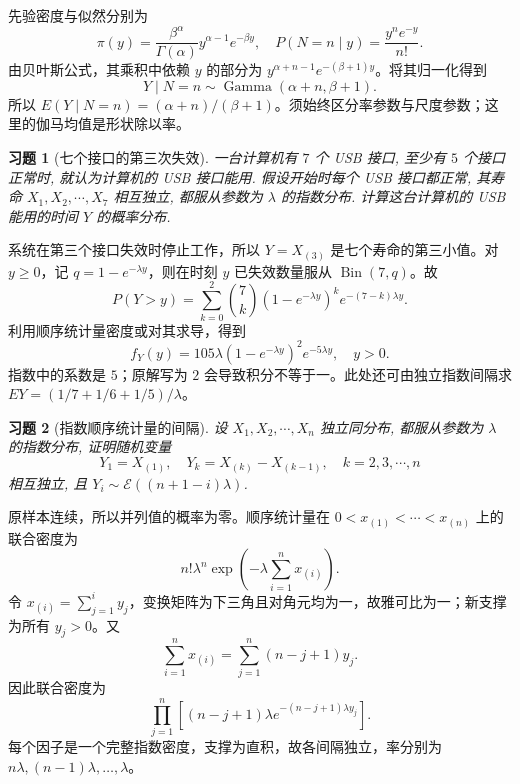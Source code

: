 \documentclass[UTF8,12pt,a4paper,fontset=fandol]{ctexart}
\newtheorem{exercise}{习题}[section]
\begin{document}
\begin{solve}\label{a:A6.15}先验密度与似然分别为\[\pi(y)=\frac{\beta^\alpha}{\Gamma(\alpha)}y^{\alpha-1}e^{-\beta y},\quad P(N=n\mid y)=\frac{y^ne^{-y}}{n!}.\]由贝叶斯公式，其乘积中依赖 $y$ 的部分为 $y^{\alpha+n-1}e^{-(\beta+1)y}$。将其归一化得到\[Y\mid N=n\sim\operatorname{Gamma}(\alpha+n,\beta+1).\]所以 $E(Y\mid N=n)=(\alpha+n)/(\beta+1)$。须始终区分率参数与尺度参数；这里的伽马均值是形状除以率。\end{solve}

\begin{exercise}[七个接口的第三次失效]\label{q:A6.17}
一台计算机有 $7$ 个 USB 接口, 至少有 $5$ 个接口正常时, 就认为计算机的 USB 接口能用. 假设开始时每个 USB 接口都正常, 其寿命 $X_1,X_2,\cdots,X_7$ 相互独立, 都服从参数为 $\lambda$ 的指数分布. 计算这台计算机的 USB 能用的时间 $Y$ 的概率分布.\par{}
\end{exercise}

\begin{solve}\label{a:A6.17}系统在第三个接口失效时停止工作，所以 $Y=X_{(3)}$ 是七个寿命的第三小值。对 $y\ge0$，记 $q=1-e^{-\lambda y}$，则在时刻 $y$ 已失效数量服从 $\operatorname{Bin}(7,q)$。故\[P(Y>y)=\sum_{k=0}^{2}\binom7k(1-e^{-\lambda y})^k e^{-(7-k)\lambda y}.\]利用顺序统计量密度或对其求导，得到\[f_Y(y)=105\lambda(1-e^{-\lambda y})^2e^{-5\lambda y},\quad y>0.\]指数中的系数是 $5$；原解写为 $2$ 会导致积分不等于一。此处还可由独立指数间隔求 $EY=(1/7+1/6+1/5)/\lambda$。\end{solve}

\begin{exercise}[指数顺序统计量的间隔]\label{q:A6.20}
设 $X_1,X_2,\cdots,X_n$ 独立同分布, 都服从参数为 $\lambda$ 的指数分布, 证明随机变量
    \[Y_1=X_{(1)},\quad Y_k=X_{(k)}-X_{(k-1)},\quad k=2,3,\cdots,n\]
    相互独立, 且 $Y_i\sim\mathcal{E}((n+1-i)\lambda)$.\par{}
\end{exercise}

\begin{solve}\label{a:A6.20}原样本连续，所以并列值的概率为零。顺序统计量在 $0<x_{(1)}<\cdots<x_{(n)}$ 上的联合密度为\[n!\lambda^n\exp\left(-\lambda\sum_{i=1}^nx_{(i)}\right).\]令 $x_{(i)}=\sum_{j=1}^iy_j$，变换矩阵为下三角且对角元均为一，故雅可比为一；新支撑为所有 $y_j>0$。又\[\sum_{i=1}^nx_{(i)}=\sum_{j=1}^n(n-j+1)y_j.\]因此联合密度为\[\prod_{j=1}^n\left[(n-j+1)\lambda e^{-(n-j+1)\lambda y_j}\right].\]每个因子是一个完整指数密度，支撑为直积，故各间隔独立，率分别为 $n\lambda,(n-1)\lambda,\ldots,\lambda$。\end{solve}
\end{document}
